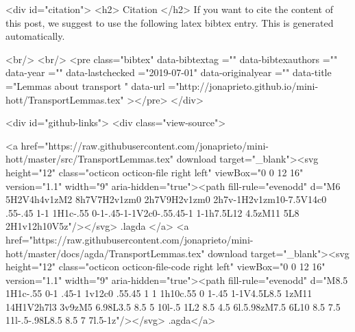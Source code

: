{{  
  <div id="citation">
  <h2> Citation </h2>
  If you want to cite the content of this post,
  we suggest to use the following latex bibtex entry.
  This is generated automatically.

  <br/>
  <br/>
  <pre class="bibtex"
       data-bibtextag =""
       data-bibtexauthors =""
       data-year =""
       data-lastchecked ="2019-07-01"
       data-originalyear =""
       data-title ="Lemmas about transport "
       data-url ="http://jonaprieto.github.io/mini-hott/TransportLemmas.tex"
  ></pre>
  </div>
  

  <div id="github-links">
    <div class="view-source">
      
        <a href="https://raw.githubusercontent.com/jonaprieto/mini-hott/master/src/TransportLemmas.tex" download target="_blank"><svg height="12" class="octicon octicon-file right left" viewBox="0 0 12 16" version="1.1" width="9" aria-hidden="true"><path fill-rule="evenodd" d="M6 5H2V4h4v1zM2 8h7V7H2v1zm0 2h7V9H2v1zm0 2h7v-1H2v1zm10-7.5V14c0 .55-.45 1-1 1H1c-.55 0-1-.45-1-1V2c0-.55.45-1 1-1h7.5L12 4.5zM11 5L8 2H1v12h10V5z"/></svg> .lagda </a>
        <a href="https://raw.githubusercontent.com/jonaprieto/mini-hott/master/docs/agda/TransportLemmas.tex" download target="_blank"><svg height="12" class="octicon octicon-file-code right left" viewBox="0 0 12 16" version="1.1" width="9" aria-hidden="true"><path fill-rule="evenodd" d="M8.5 1H1c-.55 0-1 .45-1 1v12c0 .55.45 1 1 1h10c.55 0 1-.45 1-1V4.5L8.5 1zM11 14H1V2h7l3 3v9zM5 6.98L3.5 8.5 5 10l-.5 1L2 8.5 4.5 6l.5.98zM7.5 6L10 8.5 7.5 11l-.5-.98L8.5 8.5 7 7l.5-1z"/></svg> .agda</a>
      
}}
